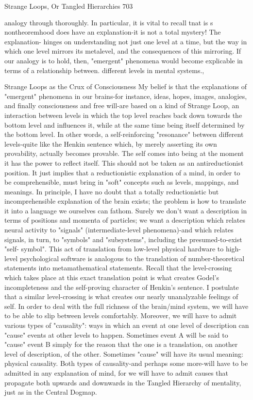 Strange Loops, Or Tangled Hierarchies                                                    703

analogy through thoroughly. In particular, it is vital to recall tnat is s nontheoremhood
does have an explanation-it is not a total mystery! The explanation- hinges on
understanding not just one level at a time, but the way in which one level mirrors its
metalevel, and the consequences of this mirroring. If our analogy is to hold, then,
"emergent" phenomena would become explicable in terms of a relationship between.
different levels in mental systems.,

                  Strange Loops as the Crux of Consciousness
My belief is that the explanations of "emergent" phenomena in our brains-for instance,
ideas, hopes, images, analogies, and finally consciousness and free will-are based on a
kind of Strange Loop, an interaction between levels in which the top level reaches back
down towards the bottom level and influences it, while at the same time being itself
determined by the bottom level. In other words, a self-reinforcing "resonance" between
different levels-quite like the Henkin sentence which, by merely asserting its own
provability, actually becomes provable. The self comes into being at the moment it has
the power to reflect itself.
        This should not be taken as an antireductionist position. It just implies that a
reductionistic explanation of a mind, in order to be comprehensible, must bring in "soft"
concepts such as levels, mappings, and meanings. In principle, I have no doubt that a
totally reductionistic but incomprehensible explanation of the brain exists; the problem is
how to translate it into a language we ourselves can fathom. Surely we don't want a
description in terms of positions and momenta of particles; we want a description which
relates neural activity to "signals" (intermediate-level phenomena)-and which relates
signals, in turn, to "symbols" and "subsystems", including the presumed-to-exist "self-
symbol". This act of translation from low-level physical hardware to high-level
psychological software is analogous to the translation of number-theoretical statements
into metamathematical statements. Recall that the level-crossing which takes place at this
exact translation point is what creates Godel's incompleteness and the self-proving
character of Henkin's sentence. I postulate that a similar level-crossing is what creates our
nearly unanalyzable feelings of self.
        In order to deal with the full richness of the brain/mind system, we will have to be
able to slip between levels comfortably. Moreover, we will have to admit various types of
"causality": ways in which an event at one level of description can "cause" events at other
levels to happen. Sometimes event A will be said to "cause" event B simply for the
reason that the one is a translation, on another level of description, of the other.
Sometimes "cause" will have its usual meaning: physical causality. Both types of
causality-and perhaps some more-will have to be admitted in any explanation of mind,
for we will have to admit causes that propagate both upwards and downwards in the
Tangled Hierarchy of mentality, just as in the Central Dogmap.




